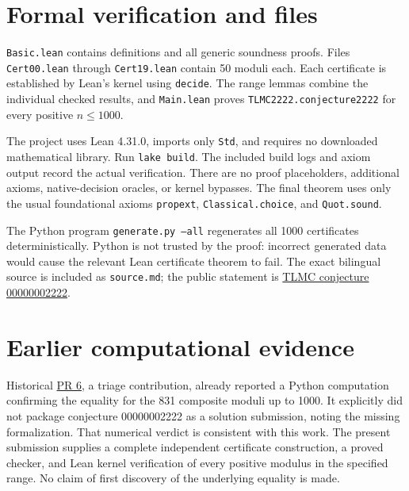 \documentclass[10pt]{article}
\begin{document}
\section{Formal verification and files}
\texttt{Basic.lean} contains definitions and all generic soundness proofs. Files \texttt{Cert00.lean} through \texttt{Cert19.lean} contain 50 moduli each. Each certificate is established by Lean's kernel using \texttt{decide}. The range lemmas combine the individual checked results, and \texttt{Main.lean} proves \texttt{TLMC2222.conjecture2222} for every positive $n\le1000$.

The project uses Lean 4.31.0, imports only \texttt{Std}, and requires no downloaded mathematical library. Run \texttt{lake build}. The included build logs and axiom output record the actual verification. There are no proof placeholders, additional axioms, native-decision oracles, or kernel bypasses. The final theorem uses only the usual foundational axioms \texttt{propext}, \texttt{Classical.choice}, and \texttt{Quot.sound}.

The Python program \texttt{generate.py --all} regenerates all 1000 certificates deterministically. Python is not trusted by the proof: incorrect generated data would cause the relevant Lean certificate theorem to fail. The exact bilingual source is included as \texttt{source.md}; the public statement is \href{https://github.com/The-Last-Math-Competition/The-Last-Math-Competition/blob/main/conjectures/00000002222.md}{TLMC conjecture 00000002222}.
\section{Earlier computational evidence}
Historical \href{https://github.com/The-Last-Math-Competition/The-Last-Math-Competition/pull/6}{PR 6}, a triage contribution, already reported a Python computation confirming the equality for the 831 composite moduli up to 1000. It explicitly did not package conjecture 00000002222 as a solution submission, noting the missing formalization. That numerical verdict is consistent with this work. The present submission supplies a complete independent certificate construction, a proved checker, and Lean kernel verification of every positive modulus in the specified range. No claim of first discovery of the underlying equality is made.
\end{document}
